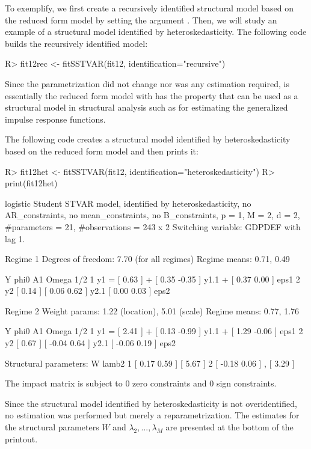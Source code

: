 \documentclass[nojss]{jss}
\begin{document}
To exemplify, we first create a recursively identified structural model based on the reduced form model  by setting the argument . Then, we will study an example of a structural model identified by heteroskedasticity. The following code builds the recursively identified model:
\begin{CodeChunk}
\begin{CodeInput}
R> fit12rec <- fitSSTVAR(fit12, identification="recursive")
\end{CodeInput}
\end{CodeChunk}
Since the parametrization did not change nor was any estimation required,  is essentially the reduced form model  with has the property that can be used as a structural model in structural analysis such as for estimating the generalized impulse response functions.

The following code creates a structural model identified by heteroskedasticity based on the reduced form model  and then prints it:
\begin{CodeChunk}
\begin{CodeInput}
R> fit12het <- fitSSTVAR(fit12, identification="heteroskedasticity")
R> print(fit12het)
\end{CodeInput}
\begin{CodeOutput}
logistic Student STVAR model, identified by heteroskedasticity, no AR_constraints,
no mean_constraints, no B_constraints,
  p = 1, M = 2, d = 2, #parameters = 21, #observations = 243 x 2
  Switching variable: GDPDEF with lag 1.

Regime 1
Degrees of freedom: 7.70 (for all regimes)
Regime means: 0.71, 0.49

   Y     phi0          A1                  Omega        1/2
1 y1 = [ 0.63 ] + [  0.35 -0.35 ] y1.1 + [  0.37 0.00 ]     eps1
2 y2   [ 0.14 ]   [  0.06  0.62 ] y2.1   [  0.00 0.03 ]     eps2

Regime 2
Weight params: 1.22 (location), 5.01 (scale)
Regime means: 0.77, 1.76

   Y     phi0          A1                  Omega         1/2
1 y1 = [ 2.41 ] + [  0.13 -0.99 ] y1.1 + [  1.29 -0.06 ]     eps1
2 y2   [ 0.67 ]   [ -0.04  0.64 ] y2.1   [ -0.06  0.19 ]     eps2

Structural parameters:
        W             lamb2
1 [  0.17  0.59 ]   [  5.67 ]
2 [ -0.18  0.06 ] , [  3.29 ]

The impact matrix is subject to 0 zero constraints and 0 sign constraints.
\end{CodeOutput}
\end{CodeChunk}
%
Since the structural model identified by heteroskedasticity is not overidentified, no estimation was performed but merely a reparametrization. The estimates for the structural parameters $W$ and $\lambda_2,...,\lambda_M$ are presented at the bottom of the printout.
\end{document}
